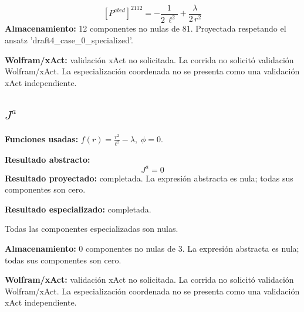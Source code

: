 \documentclass[11pt]{article}
\begin{document}
\begin{dmath*}[breakdepth={5}]
\left[P^{abcd}\right]^{2112} = -\frac{1}{2\,{\ell}^{2}} + \frac{\lambda}{2\,{r}^{2}}
\end{dmath*}
\textbf{Almacenamiento:} 12 componentes no nulas de 81. Proyectada respetando el ansatz 'draft4\_case\_0\_specialized'.\par
\textbf{Wolfram/xAct:} validación xAct no solicitada. La corrida no solicitó validación Wolfram/xAct. La especialización coordenada no se presenta como una validación xAct independiente.\par\medskip
{}
\subsection*{$ J^a $}
\textbf{Funciones usadas:} $ f\!\left(r\right) = \frac{{r}^{2}}{{\ell}^{2}} - \lambda,\;\phi=0 $.\par
\textbf{Resultado abstracto:}
\begin{dmath*}[breakdepth={5}]
J^a = 0
\end{dmath*}
\textbf{Resultado proyectado:} completada. La expresión abstracta es nula; todas sus componentes son cero.\par
\textbf{Resultado especializado:} completada.\par
Todas las componentes especializadas son nulas.\par
\textbf{Almacenamiento:} 0 componentes no nulas de 3. La expresión abstracta es nula; todas sus componentes son cero.\par
\textbf{Wolfram/xAct:} validación xAct no solicitada. La corrida no solicitó validación Wolfram/xAct. La especialización coordenada no se presenta como una validación xAct independiente.\par\medskip
{}
\end{document}
